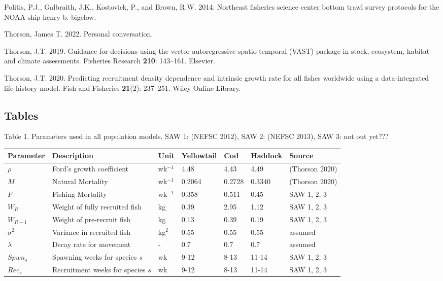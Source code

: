 \documentclass[
  12pt,
]{article}
\newlength{\cslhangindent}
\newlength{\cslentryspacingunit} %
\newenvironment{CSLReferences}[2] %
 {%
  \setlength{\parindent}{0pt}
  \ifodd #1
  \let\oldpar\par
  \def\par{\hangindent=\cslhangindent\oldpar}
  \fi
  \setlength{\parskip}{#2\cslentryspacingunit}
 }%
 {}
\begin{document}
\begin{CSLReferences}{1}{0}
\leavevmode{}%
Politis, P.J., Galbraith, J.K., Kostovick, P., and Brown, R.W. 2014. Northeast fisheries science center bottom trawl survey protocols for the NOAA ship henry b. bigelow.

\leavevmode{}%
Thorson, James T. 2022. Personal conversation.

\leavevmode{}%
Thorson, J.T. 2019. Guidance for decisions using the vector autoregressive spatio-temporal (VAST) package in stock, ecosystem, habitat and climate assessments. Fisheries Research \textbf{210}: 143--161. Elsevier.

\leavevmode{}%
Thorson, J.T. 2020. Predicting recruitment density dependence and intrinsic growth rate for all fishes worldwide using a data-integrated life-history model. Fish and Fisheries \textbf{21}(2): 237--251. Wiley Online Library.

\end{CSLReferences}

\pagebreak

\hypertarget{tables}{%
\subsection{Tables}\label{tables}}

\pagebreak

Table 1. Parameters used in all population models. SAW 1: (NEFSC 2012), SAW 2: (NEFSC 2013), SAW 3: not out yet???

\begin{longtable}[]{@{}lllllll@{}}
\toprule
Parameter & Description & Unit & Yellowtail & Cod & Haddock & Source \\
\midrule
\endhead
\(\rho\) & Ford's growth coefficient & wk\(^{-1}\) & 4.48 & 4.43 & 4.49 & (Thorson 2020) \\
\(M\) & Natural Mortality & wk\(^{-1}\) & 0.2064 & 0.2728 & 0.3340 & (Thorson 2020) \\
\(F\) & Fishing Mortality & wk\(^{-1}\) & 0.358 & 0.511 & 0.45 & SAW 1, 2, 3 \\
\(W_R\) & Weight of fully recruited fish & kg & 0.39 & 2.95 & 1.12 & SAW 1, 2, 3 \\
\(W_{R-1}\) & Weight of pre-recruit fish & kg & 0.13 & 0.39 & 0.19 & SAW 1, 2, 3 \\
\(\sigma^2\) & Variance in recruited fish & kg\(^2\) & 0.55 & 0.55 & 0.55 & assumed \\
\(\lambda\) & Decay rate for movement & - & 0.7 & 0.7 & 0.7 & assumed \\
\(Spwn_s\) & Spawning weeks for species \(s\) & wk & 9-12 & 8-13 & 11-14 & SAW 1, 2, 3 \\
\(Rec_s\) & Recruitment weeks for species \(s\) & wk & 9-12 & 8-13 & 11-14 & SAW 1, 2, 3 \\
\bottomrule
\end{longtable}
\end{document}
